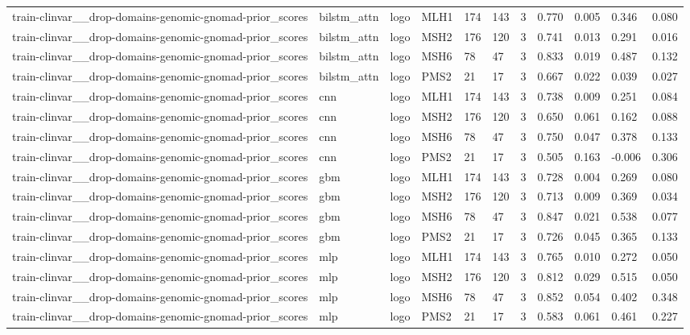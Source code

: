 \begin{table}[t]
\begin{tabular}{lllllllllll}
train-clinvar\_\_drop-domains-genomic-gnomad-prior\_scores & bilstm\_attn & logo & MLH1 & 174 & 143 & 3 & 0.770 & 0.005 & 0.346 & 0.080 \\
train-clinvar\_\_drop-domains-genomic-gnomad-prior\_scores & bilstm\_attn & logo & MSH2 & 176 & 120 & 3 & 0.741 & 0.013 & 0.291 & 0.016 \\
train-clinvar\_\_drop-domains-genomic-gnomad-prior\_scores & bilstm\_attn & logo & MSH6 & 78 & 47 & 3 & 0.833 & 0.019 & 0.487 & 0.132 \\
train-clinvar\_\_drop-domains-genomic-gnomad-prior\_scores & bilstm\_attn & logo & PMS2 & 21 & 17 & 3 & 0.667 & 0.022 & 0.039 & 0.027 \\
train-clinvar\_\_drop-domains-genomic-gnomad-prior\_scores & cnn & logo & MLH1 & 174 & 143 & 3 & 0.738 & 0.009 & 0.251 & 0.084 \\
train-clinvar\_\_drop-domains-genomic-gnomad-prior\_scores & cnn & logo & MSH2 & 176 & 120 & 3 & 0.650 & 0.061 & 0.162 & 0.088 \\
train-clinvar\_\_drop-domains-genomic-gnomad-prior\_scores & cnn & logo & MSH6 & 78 & 47 & 3 & 0.750 & 0.047 & 0.378 & 0.133 \\
train-clinvar\_\_drop-domains-genomic-gnomad-prior\_scores & cnn & logo & PMS2 & 21 & 17 & 3 & 0.505 & 0.163 & -0.006 & 0.306 \\
train-clinvar\_\_drop-domains-genomic-gnomad-prior\_scores & gbm & logo & MLH1 & 174 & 143 & 3 & 0.728 & 0.004 & 0.269 & 0.080 \\
train-clinvar\_\_drop-domains-genomic-gnomad-prior\_scores & gbm & logo & MSH2 & 176 & 120 & 3 & 0.713 & 0.009 & 0.369 & 0.034 \\
train-clinvar\_\_drop-domains-genomic-gnomad-prior\_scores & gbm & logo & MSH6 & 78 & 47 & 3 & 0.847 & 0.021 & 0.538 & 0.077 \\
train-clinvar\_\_drop-domains-genomic-gnomad-prior\_scores & gbm & logo & PMS2 & 21 & 17 & 3 & 0.726 & 0.045 & 0.365 & 0.133 \\
train-clinvar\_\_drop-domains-genomic-gnomad-prior\_scores & mlp & logo & MLH1 & 174 & 143 & 3 & 0.765 & 0.010 & 0.272 & 0.050 \\
train-clinvar\_\_drop-domains-genomic-gnomad-prior\_scores & mlp & logo & MSH2 & 176 & 120 & 3 & 0.812 & 0.029 & 0.515 & 0.050 \\
train-clinvar\_\_drop-domains-genomic-gnomad-prior\_scores & mlp & logo & MSH6 & 78 & 47 & 3 & 0.852 & 0.054 & 0.402 & 0.348 \\
train-clinvar\_\_drop-domains-genomic-gnomad-prior\_scores & mlp & logo & PMS2 & 21 & 17 & 3 & 0.583 & 0.061 & 0.461 & 0.227 \\

\end{tabular}
\end{table}
